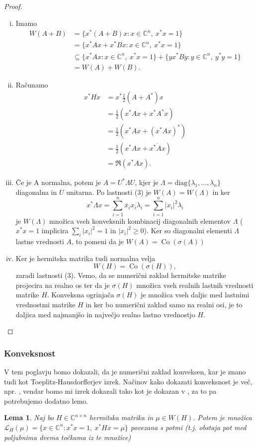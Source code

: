 \documentclass[12pt,a4paper]{amsart}
\theoremstyle{definition}
\theoremstyle{plain}
\newtheorem{lema}[definicija]{Lema}
\newcommand{\Co}{\operatorname{Co}} %
\newcommand{\LH}{\mathcal{L}}
\newcommand{\C}{\mathbb C}
\begin{document}
\begin{proof}
\begin{enumerate}[(i)]
\item Imamo
\begin{align*}
W(A+B)&=\{x^\ast(A+B)x\! : x\in \C^n,\ x^\ast x=1\}\\
& = \{x^\ast Ax +x^\ast Bx\! : x\in \C^n,\ x^\ast x=1\}\\
& \subseteq \{x^\ast Ax\! : x\in \C^n,\ x^\ast x=1\}+\{yx^\ast By\! : y\in \C^n,\ y^\ast y=1\}\\
& =W(A) + W(B).
\end{align*}
\item Računamo
\begin{align*}
x^\ast Hx &= x^\ast \frac{1}{2}(A+A^\ast)x \\
 &=\frac{1}{2} (x^\ast Ax +x^\ast A^\ast x) \\
 &=\frac{1}{2}(x^\ast Ax +(x^\ast Ax)^\ast) \\
 &= \frac{1}{2}(x^\ast Ax +\overline{x^\ast Ax}) \\
 &= \Re (x^\ast Ax).
\end{align*}

\item Če je A normalna, potem je $A=U^\ast \Lambda U$, kjer je $\Lambda = \text{diag}\{\lambda_1, \dots, \lambda_n\}$ diagonalna in $U$ unitarna. 
Po lastnosti (3) je $W(A)=W(\Lambda)$ in ker $$x^\ast \Lambda x = \sum_{i=1}^{n} \bar{x}_i x_i\lambda_i = \sum_{i=1}^{n} |x_i|^2 \lambda_i$$ 
je $W(\Lambda)$ množica vseh konveksnih kombinacij diagonalnih elementov $\Lambda$ ($x^\ast x=1$ implicira $ \sum_{i} |x_i|^2 =1$ in $|x_i|^2 \geq 0$). 
Ker so diagonalni elementi $\Lambda$ lastne vrednosti $A$, to pomeni da je $W(A) =\Co(\sigma(A))$

\item Ker je hermitska matrika tudi normalna velja $$W(H) = \Co(\sigma(H)),$$ zaradi lastnosti (3). 
Vemo, da se numerični zaklad hermitske matrike projecira na realno os ter da je $\sigma(H)$ množica vseh realnih lastnih vrednosti matrike $H$. 
Konveksna ogrinjača $\sigma(H)$ je množica vseh daljic med lastnimi vrednostmi matrike $H$ in ker bo numerični zaklad samo na realni osi, je to daljica med najmanjšo in največjo realno lastno vrednostjo $H$.
\end{enumerate}
\end{proof}
\subsubsection{Konveksnost}
V tem poglavju bomo dokazali, da je numerični zaklad konveksen, kar je znano tudi kot Toeplitz-Hausdorfferjev izrek. 
Načinov kako dokazati konveksnost je več, npr. \cite{num}, vendar bomo mi izrek dokazali tako kot je dokazan v \cite{zaloga}, za to pa potrebujemo dodatno lemo. 
\begin{lema}
Naj bo $H\in \C^{n\times n}$ hermitska matrika in $\mu \in W(H)$. Potem je množica $\LH _{H}(\mu)=\{x\in \C^n \! : x^\ast x=1,\ x^\ast Hx=\mu\}$ povezana s potmi (t.j. obstaja pot med poljubnima dvema točkama iz te množice)%
\end{lema}
\end{document}
